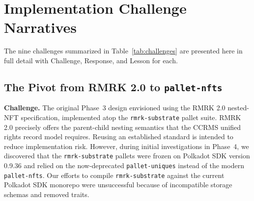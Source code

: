 
\chapter{Implementation Challenge Narratives}\label{app:challenges}

The nine challenges summarized in Table~\ref{tab:challenges} are presented here in full detail with Challenge, Response, and Lesson for each.

\section{The Pivot from RMRK 2.0 to \texttt{pallet-nfts}}\label{sec:rmrk-to-pallet-nfts}

\textbf{Challenge.} The original Phase~3 design envisioned using the RMRK 2.0 nested-NFT specification, implemented atop the \texttt{rmrk-substrate} pallet suite. RMRK 2.0 precisely offers the parent-child nesting semantics that the CCRMS unified rights record model requires. Reusing an established standard is intended to reduce implementation risk. However, during initial investigations in Phase~4, we discovered that the \texttt{rmrk-substrate} pallets were frozen on Polkadot SDK version 0.9.36 and relied on the now-deprecated \texttt{pallet-uniques} instead of the modern \texttt{pallet-nfts}. Our efforts to compile \texttt{rmrk-substrate} against the current Polkadot SDK monorepo were unsuccessful because of incompatible storage schemas and removed traits.

